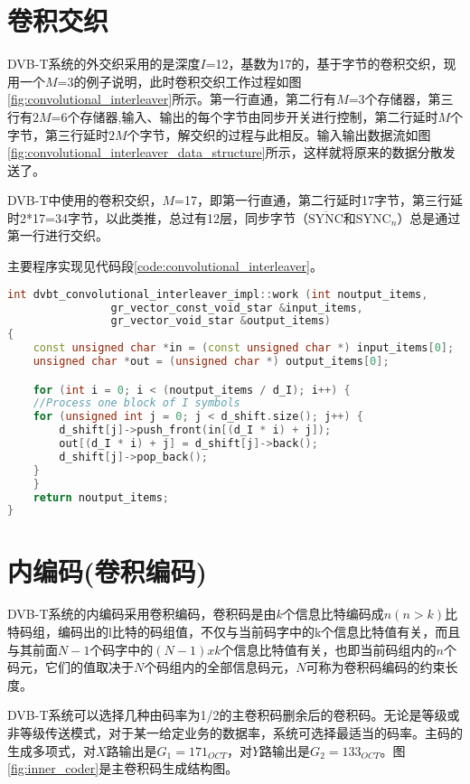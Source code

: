 	\section{卷积交织}
		\par DVB-T系统的外交织采用的是深度$I$=12，基数为17的，基于字节的卷积交织，现用一个$M$=3的例子说明，此时卷积交织工作过程如图\ref{fig:convolutional_interleaver}所示。第一行直通，第二行有$M$=3个存储器，第三行有$2M$=6个存储器,输入、输出的每个字节由同步开关进行控制，第二行延时$M$个字节，第三行延时$2M$个字节，解交织的过程与此相反。输入输出数据流如图\ref{fig:convolutional_interleaver_data_structure}所示\cite{用FPGA实现DVB标准中的卷积交织_刘静}，这样就将原来的数据分散发送了。
		
		
		\par DVB-T中使用的卷积交织，$M$=17，即第一行直通，第二行延时17字节，第三行延时2*17=34字节，以此类推，总过有12层，同步字节（$\overline{\text{SYNC}}$和$\text{SYNC}_n$）总是通过第一行进行交织。
		\par 主要程序实现见代码段\ref{code:convolutional_interleaver}。
		\begin{lstlisting}[caption = {卷积交织},label = {code:convolutional_interleaver},language = C++ ]
int dvbt_convolutional_interleaver_impl::work (int noutput_items,
				gr_vector_const_void_star &input_items,
				gr_vector_void_star &output_items)
{
	const unsigned char *in = (const unsigned char *) input_items[0];
	unsigned char *out = (unsigned char *) output_items[0];

	for (int i = 0; i < (noutput_items / d_I); i++) {
	//Process one block of I symbols
	for (unsigned int j = 0; j < d_shift.size(); j++) {
		d_shift[j]->push_front(in[(d_I * i) + j]);
		out[(d_I * i) + j] = d_shift[j]->back();
		d_shift[j]->pop_back();
	}
	}
	return noutput_items;
}
		\end{lstlisting}
	\section{内编码(卷积编码)}
		\par DVB-T系统的内编码采用卷积编码，卷积码是由$k$个信息比特编码成$n(n>k)$比特码组，编码出的l比特的码组值，不仅与当前码字中的k个信息比特值有关，而且与其前面$N-1$个码字中的$(N-1)xk$个信息比特值有关，也即当前码组内的$n$个码元，它们的值取决于$N$个码组内的全部信息码元，$N$可称为卷积码编码的约束长度。
		\par DVB-T系统可以选择几种由码率为1/2的主卷积码删余后的卷积码。无论是等级或非等级传送模式，对于某一给定业务的数据率，系统可选择最适当的码率。主码的生成多项式，对$X$路输出是$G_1=171_{OCT}$，对$Y$路输出是$G_2=133_{OCT}$。图\ref{fig:inner_coder}是主卷积码生成结构图。
		
